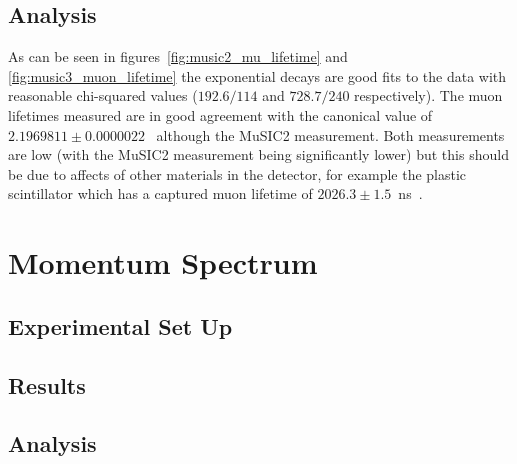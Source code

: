 \section{Analysis} %
\label{sec:analysis}
As can be seen in figures~\ref{fig:music2_mu_lifetime} and \ref{fig:music3_muon_lifetime} the exponential decays are good fits to the data with reasonable chi-squared values (\(192.6/114\) and \( 728.7/240 \) respectively). The muon lifetimes measured are in good agreement with the canonical value of \(2.1969811\pm0.0000022\)~\cite{PDG} although the MuSIC2 measurement. Both measurements are low (with the MuSIC2 measurement being significantly lower) but this should be due to affects of other materials in the detector, for example the plastic scintillator which has a captured muon lifetime of \(2026.3\pm1.5\)~ns~\cite{SUZUKI}. 

\chapter{Momentum Spectrum} %
\label{cha:momentum_spectrum}
\section{Experimental Set Up} %
\label{sec:experimental_set_up}
\section{Results} %
\label{sec:results}

\section{Analysis} %
\label{sec:analysis}






















